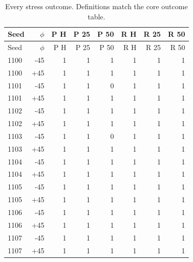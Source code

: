 \documentclass[10pt,letterpaper]{article}
\begin{document}
{\small
\begin{longtable}{lrrrrrrr}
\caption{Every stress outcome. Definitions match the core outcome table.}\\
\toprule
Seed & $\phi$ & P H & P 25 & P 50 & R H & R 25 & R 50\\
\midrule\endfirsthead
\toprule
Seed & $\phi$ & P H & P 25 & P 50 & R H & R 25 & R 50\\
\midrule\endhead
1100 & -45 & 1 & 1 & 1 & 1 & 1 & 1\\
1100 & +45 & 1 & 1 & 1 & 1 & 1 & 1\\
1101 & -45 & 1 & 1 & 0 & 1 & 1 & 1\\
1101 & +45 & 1 & 1 & 1 & 1 & 1 & 1\\
1102 & -45 & 1 & 1 & 1 & 1 & 1 & 1\\
1102 & +45 & 1 & 1 & 1 & 1 & 1 & 1\\
1103 & -45 & 1 & 1 & 0 & 1 & 1 & 1\\
1103 & +45 & 1 & 1 & 1 & 1 & 1 & 1\\
1104 & -45 & 1 & 1 & 1 & 1 & 1 & 1\\
1104 & +45 & 1 & 1 & 1 & 1 & 1 & 1\\
1105 & -45 & 1 & 1 & 1 & 1 & 1 & 1\\
1105 & +45 & 1 & 1 & 1 & 1 & 1 & 1\\
1106 & -45 & 1 & 1 & 1 & 1 & 1 & 1\\
1106 & +45 & 1 & 1 & 1 & 1 & 1 & 1\\
1107 & -45 & 1 & 1 & 1 & 1 & 1 & 1\\
1107 & +45 & 1 & 1 & 1 & 1 & 1 & 1\\
\bottomrule
\end{longtable}
}
\end{document}
